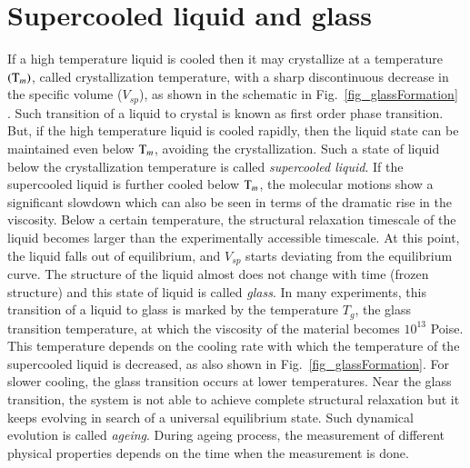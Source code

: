 \section{Supercooled liquid and glass}
If a high temperature liquid is cooled then it may crystallize at a temperature $({\rm T}_m)$, called crystallization temperature, with a sharp discontinuous decrease in the specific volume ($V_{sp}$), as shown in the schematic in Fig.~\ref{fig_glassFormation} \cite{debenedetti2001supercooled}. Such transition of a liquid to crystal is known as first order phase transition. But, if the high temperature liquid is cooled rapidly, then the liquid state can be maintained even below ${\rm T}_m$, avoiding the crystallization. Such a state of liquid below the crystallization temperature is called {\em supercooled liquid}. If the supercooled liquid is further cooled below ${\rm T}_m$, the molecular motions show a significant slowdown which can also be seen in terms of the dramatic rise in the viscosity. Below a certain temperature, the structural relaxation timescale of the liquid becomes larger than the experimentally accessible timescale. At this point, the liquid falls out of equilibrium, and $V_{sp}$ starts deviating from the equilibrium curve. The structure of the liquid almost does not change with time (frozen structure) and this state of liquid is called {\em glass}. In many experiments, this transition of a liquid to glass is marked by the temperature $T_g$, the glass transition temperature, at which the viscosity of the material becomes $10^{13}$ Poise. This temperature depends on the cooling rate with which the temperature of the supercooled liquid is decreased, as also shown in  Fig.~\ref{fig_glassFormation}. For slower cooling, the glass transition occurs at lower temperatures. Near the glass transition, the system is not able to achieve complete structural relaxation but it keeps evolving in search of a universal equilibrium state. Such dynamical evolution is called {\em ageing}. During ageing process, the measurement of different physical properties depends on the time when the measurement is done. 


